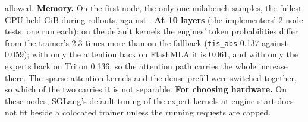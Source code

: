 allowed. \textbf{Memory.} On the first node, the only one milabench samples, the fullest GPU held \TriGrKnGpuRollout{} GiB during rollouts, against \TriGrGpuRollout. \textbf{At 10 layers} (the implementers' 2-node tests, one run each): on the default kernels the engines' token probabilities differ from the trainer's 2.3 times more than on the fallback (\texttt{tis\_abs} 0.137 against 0.059); with only the attention back on FlashMLA it is 0.061, and with only the experts back on Triton 0.136, so the attention path carries the whole increase there. The sparse-attention kernels and the dense prefill were switched together, so which of the two carries it is not separable. \textbf{For choosing hardware.} On these nodes, SGLang's default tuning of the expert kernels at engine start does not fit beside a colocated trainer unless the running requests are capped.

